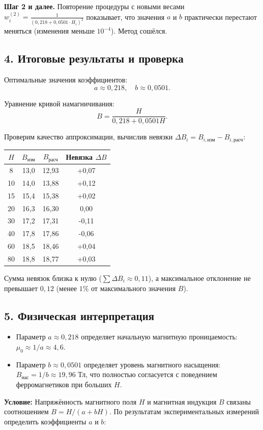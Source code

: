 \documentclass{article}
\begin{document}
\textbf{Шаг 2 и далее.} 
Повторение процедуры с новыми весами $w_i^{(2)} = \frac{1}{(0{,}218 + 0{,}0501 \cdot H_i)^2}$ показывает, что значения $a$ и $b$ практически перестают меняться (изменения меньше $10^{-4}$). Метод сошёлся.

\subsection*{4. Итоговые результаты и проверка}

Оптимальные значения коэффициентов:
\begin{equation}
\boxed{a \approx 0{,}218, \quad b \approx 0{,}0501.}
\end{equation}

Уравнение кривой намагничивания:
\begin{equation}
B = \frac{H}{0{,}218 + 0{,}0501H}.
\end{equation}

Проверим качество аппроксимации, вычислив невязки $\Delta B_i = B_{i,\text{изм}} - B_{i,\text{расч}}$:

\begin{center}
\begin{tabular}{|c|c|c|c|}
\hline
$H$ & $B_{\text{изм}}$ & $B_{\text{расч}}$ & Невязка $\Delta B$ \\
\hline
8 & 13,0 & 12,93 & +0,07 \\
10 & 14,0 & 13,88 & +0,12 \\
15 & 15,4 & 15,38 & +0,02 \\
20 & 16,3 & 16,30 & 0,00 \\
30 & 17,2 & 17,31 & -0,11 \\
40 & 17,8 & 17,86 & -0,06 \\
60 & 18,5 & 18,46 & +0,04 \\
80 & 18,8 & 18,77 & +0,03 \\
\hline
\end{tabular}
\end{center}

Сумма невязок близка к нулю ($\sum \Delta B_i \approx 0{,}11$), а максимальное отклонение не превышает $0{,}12$ (менее $1\%$ от максимального значения $B$).

\subsection*{5. Физическая интерпретация}
\begin{itemize}
    \item Параметр $a \approx 0{,}218$ определяет начальную магнитную проницаемость: $\mu_0 \approx 1/a \approx 4{,}6$.
    \item Параметр $b \approx 0{,}0501$ определяет уровень магнитного насыщения: $B_{\text{нас}} = 1/b \approx 19{,}96$ Тл, что полностью согласуется с поведением ферромагнетиков при больших $H$.
\end{itemize}
\textbf{Условие:} Напряжённость магнитного поля $H$ и магнитная индукция $B$ связаны соотношением $B = H/(a + bH)$. По результатам экспериментальных измерений определить коэффициенты $a$ и $b$:
\end{document}
